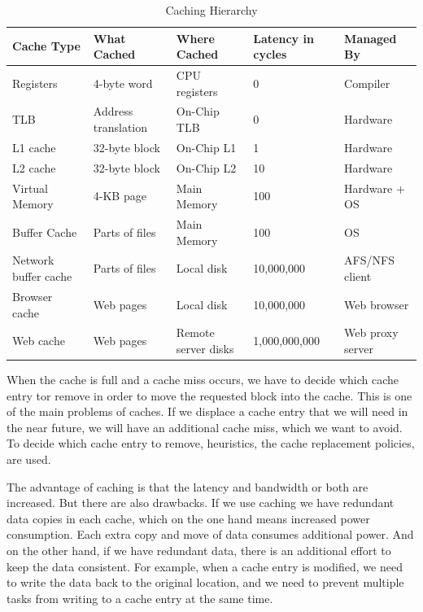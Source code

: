 \documentclass[
	12pt,
	a4paper,
	abstract,
	bibliography=totoc,
	chapterprefix,
	headings=openright,
	numbers=endperiod,
	parskip=half,
	twoside,
]{scrreprt}
\begin{document}
\begin{table}[ht]
	\centering
	\begin{tabular}{|p{3cm}|p{3cm}|p{3cm}|p{2cm}|p{3cm}|}
		\hline
		\textbf{Cache Type} & \textbf{What Cached} & \textbf{Where Cached} & \textbf{Latency in cycles} & \textbf{Managed By}\\
		\hline
		Registers & 4-byte word & CPU registers & 0 & Compiler \\
		\hline
		TLB & Address translation & On-Chip TLB & 0 & Hardware \\
		\hline
		L1 cache & 32-byte block & On-Chip L1 & 1 & Hardware \\
		\hline
		L2 cache & 32-byte block & On-Chip L2 & 10 & Hardware \\
		\hline
		Virtual Memory & 4-KB page & Main Memory & 100 & Hardware + OS \\
		\hline
		Buffer Cache & Parts of files & Main Memory & 100 & OS \\
		\hline
		Network buffer cache & Parts of files & Local disk & 10,000,000 & AFS/NFS client \\
		\hline
		Browser cache & Web pages & Local disk & 10,000,000 & Web browser \\
		\hline
		Web cache & Web pages & Remote server disks & 1,000,000,000 & Web proxy server \\
		\hline
	\end{tabular}
	\caption{Caching Hierarchy \cite{7569243}}
	\label{tab:caching hierarchy}
\end{table}

When the cache is full and a cache miss occurs, we have to decide which cache entry tor remove in order to move the requested block into the cache.
This is one of the main problems of caches. If we displace a cache entry that we will need in the near future, we will have an additional cache miss, which we want to avoid.
To decide which cache entry to remove, heuristics, the cache replacement policies, are used.

The advantage of caching is that the latency and bandwidth or both are increased.
But there are also drawbacks.
If we use caching we have redundant data copies in each cache, which on the one hand means increased power consumption.
Each extra copy and move of data consumes additional power.
And on the other hand, if we have redundant data, there is an additional effort to keep the data consistent.
For example, when a cache entry is modified, we need to write the data back to the original location, and we need to prevent multiple tasks from writing to a cache entry at the same time.
\end{document}
